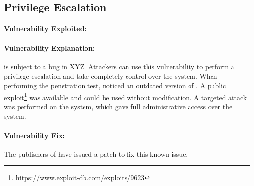 \subsection{Privilege Escalation}

\paragraph{Vulnerability Exploited:}
\vulnx

\paragraph{Vulnerability Explanation:}
\product{} is subject to a bug in XYZ.
Attackers can use this vulnerability to perform a privilege escalation and take completely control over the system.
When performing the penetration test, \name{} noticed an outdated version of \product{}. 
A public exploit\footnote{\url{https://www.exploit-db.com/exploits/9623}} was available and could be used without modification.
A targeted attack was performed on the system, which gave \name{} full administrative access over the system.

\paragraph{Vulnerability Fix:}
The publishers of \product{} have issued a patch to fix this known issue.

